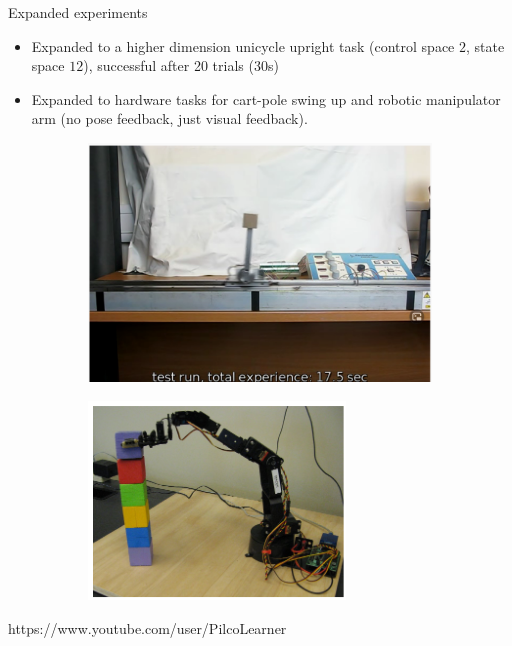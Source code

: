 \documentclass{beamer}
\begin{document}
\begin{frame}{Expanded experiments}
	\begin{minipage}{0.5\textwidth}
		\begin{itemize}
			\item Expanded to a higher dimension unicycle upright task (control space $2$, state space $12$), successful after 20 trials (30s)
			\item Expanded to hardware tasks for cart-pole swing up and robotic manipulator arm (no pose feedback, just visual feedback).
		\end{itemize}
	\end{minipage}\hfill
	\begin{minipage}{0.5\textwidth}
		\begin{figure}[ht]
			\begin{subfigure}{0.7\textwidth}
				\centering
				\includegraphics[width=\linewidth]{./cartpole_hardware.png}
			\end{subfigure}
			\begin{subfigure}{.5\textwidth}
				\centering
				\includegraphics[width=\linewidth]{./manipulator.png}
			\end{subfigure}
		\end{figure}
	\end{minipage} 
	\begin{minipage}{\textwidth}
		\centering
		https://www.youtube.com/user/PilcoLearner
	\end{minipage}
\end{frame}
\end{document}
